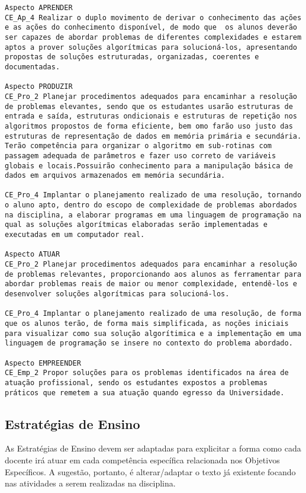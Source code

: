 \documentclass[12pt, oneside]{book}
\begin{document}
\begin{lstlisting}
Aspecto APRENDER
CE_Ap_4 Realizar o duplo movimento de derivar o conhecimento das ações e as ações do conhecimento disponível, de modo que  os alunos deverão ser capazes de abordar problemas de diferentes complexidades e estarem aptos a prover soluções algorítmicas para solucioná-los, apresentando propostas de soluções estruturadas, organizadas, coerentes e documentadas.

Aspecto PRODUZIR
CE_Pro_2 Planejar procedimentos adequados para encaminhar a resolução de problemas elevantes, sendo que os estudantes usarão estruturas de entrada e saída, estruturas ondicionais e estruturas de repetição nos algoritmos propostos de forma eficiente, bem omo farão uso justo das estruturas de representação de dados em memória primária e secundária. Terão competência para organizar o algoritmo em sub-rotinas com passagem adequada de parâmetros e fazer uso correto de variáveis globais e locais.Possuirão conhecimento para a manipulação básica de dados em arquivos armazenados em memória secundária.

CE_Pro_4 Implantar o planejamento realizado de uma resolução, tornando o aluno apto, dentro do escopo de complexidade de problemas abordados na disciplina, a elaborar programas em uma linguagem de programação na qual as soluções algorítmicas elaboradas serão implementadas e executadas em um computador real.

Aspecto ATUAR
CE_Pro_2 Planejar procedimentos adequados para encaminhar a resolução de problemas relevantes, proporcionando aos alunos as ferramentar para abordar problemas reais de maior ou menor complexidade, entendê-los e desenvolver soluções algorítmicas para solucioná-los.

CE_Pro_4 Implantar o planejamento realizado de uma resolução, de forma que os alunos terão, de forma mais simplificada, as noções iniciais para visualizar como sua solução algorítimica e a implementação em uma linguagem de programação se insere no contexto do problema abordado.

Aspecto EMPREENDER
CE_Emp_2 Propor soluções para os problemas identificados na área de atuação profissional, sendo os estudantes expostos a problemas práticos que remetem a sua atuação quando egresso da Universidade.
\end{lstlisting}

\subsection*{Estratégias de Ensino}
As Estratégias de Ensino devem ser adaptadas para explicitar a forma como cada docente irá atuar em cada competência específica relacionada nos Objetivos Específicos. A sugestão, portanto, é alterar/adaptar o texto já existente focando nas atividades a serem realizadas na disciplina.
\end{document}
